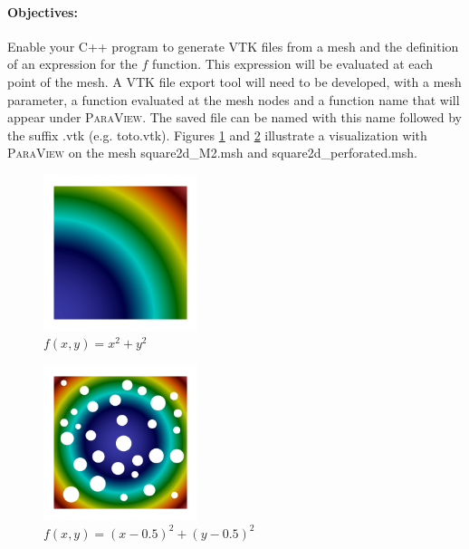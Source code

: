 \documentclass[english,10pt,a4paper]{article}
\begin{document}
\paragraph{Objectives:} Enable your C++ program to generate VTK files from a mesh and the definition of an expression for the $f$ function. This expression
will be evaluated at each point of the mesh. A VTK file export tool will need to be developed, with a mesh parameter, a function evaluated at the mesh nodes
and a function name that will appear under \textsc{ParaView}. The saved file can be named with this name followed by the suffix .vtk (e.g. toto.vtk).
Figures \ref{fig:mesh_square2d_M2_export} and \ref{fig:mesh_square2d_perforated_export} illustrate a visualization with \textsc{ParaView} on the mesh square2d\_M2.msh and square2d\_perforated.msh.

\begin{multicols}{2}
  \begin{figure}[H]
    \centering
    \includegraphics[width=0.4\textwidth]{images/square2d_M2_export.png}
    \caption{$f(x,y)=x^2+y^2$}
    \label{fig:mesh_square2d_M2_export}
  \end{figure}
  \columnbreak
  \begin{figure}[H]
    \centering
    \includegraphics[width=0.4\textwidth]{images/square2d_perforated_export.png}
    \caption{$f(x,y)=(x-0.5)^2+(y-0.5)^2$}
    \label{fig:mesh_square2d_perforated_export}
  \end{figure}
\end{multicols}
\end{document}
